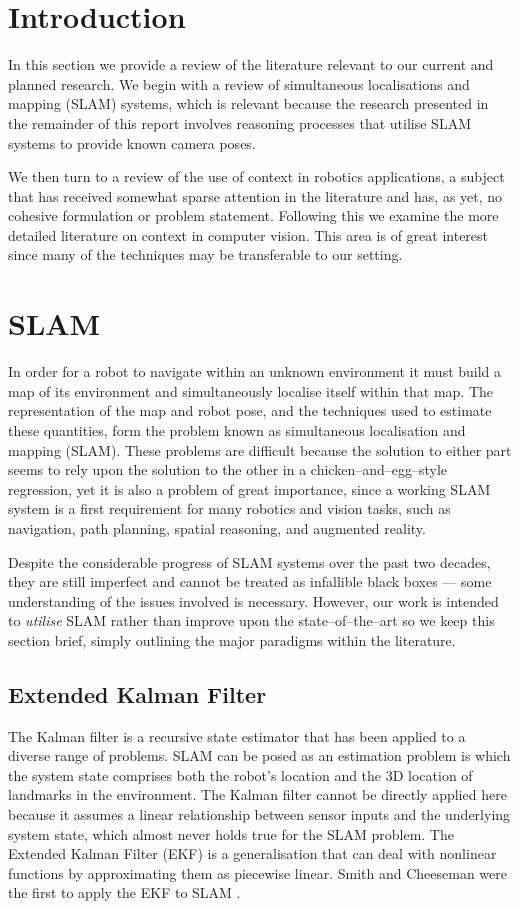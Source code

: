 \section{Introduction}
In this section we provide a review of the literature relevant to our
current and planned research. We begin with a review of simultaneous
localisations and mapping (SLAM) systems, which is relevant because the
research presented in the remainder of this report involves reasoning
processes that utilise SLAM systems to provide known camera
poses.

We then turn to a review of the use of context in robotics
applications, a subject that has received somewhat sparse attention in
the literature and has, as yet, no cohesive formulation or problem
statement. Following this we examine the more detailed literature on
context in computer vision. This area is of great interest since many
of the techniques may be transferable to our setting.

\section{SLAM}
In order for a robot to navigate within an unknown environment it must
build a map of its environment and simultaneously localise itself
within that map. The representation of the map and robot pose, and the
techniques used to estimate these quantities, form the problem known
as simultaneous localisation and mapping (SLAM). These problems are
difficult because the solution to either part seems to rely upon the
solution to the other in a chicken--and--egg--style regression, yet it
is also a problem of great importance, since a working SLAM system is
a first requirement for many robotics and vision tasks, such as
navigation, path planning, spatial reasoning, and augmented reality.

Despite the considerable progress of SLAM systems over the past two
decades, they are still imperfect and cannot be treated as infallible
black boxes --- some understanding of the issues involved is
necessary. However, our work is intended to \textit{utilise} SLAM
rather than improve upon the state--of--the--art so we keep this
section brief, simply outlining the major paradigms within the
literature.

\subsection{Extended Kalman Filter}
The Kalman filter \cite{Kalman60} is a recursive state estimator that
has been applied to a diverse range of problems. SLAM can be posed as
an estimation problem is which the system state comprises both the
robot's location and the 3D location of landmarks in the
environment. The Kalman filter cannot be directly applied here because
it assumes a linear relationship between sensor inputs and the
underlying system state, which almost never holds true for the SLAM
problem. The Extended Kalman Filter (EKF) is a generalisation that can
deal with nonlinear functions by approximating them as piecewise
linear. Smith and Cheeseman were the first to apply the EKF to SLAM
\cite{Smith87}.

